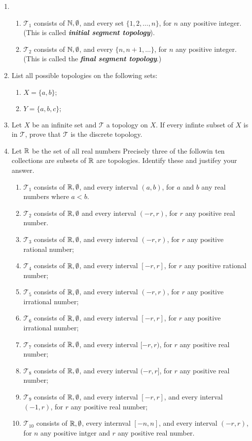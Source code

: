 \documentclass[10pt,a4paper]{report}
\newcommand{\TT}{\mathcal{T}}
\begin{document}
\begin{enumerate}
\item 
\begin{enumerate}[label=(\roman*)]
	\item $\TT_1$ consists of $\mathbb{N}, \emptyset$, and every set $\{1,2,\dots,n\}$, for $n$ any positive integer. (This is called \textbf{\textit{initial segment topology}}).
	\item $\TT_2$ consists of $\mathbb{N},\emptyset$, and every $\{n, n+1, \dots\}$, for $n$ any positive integer. (This is called the \textbf{\textit{final segment topology}}.)
\end{enumerate}

\item List all possible topologies on the following sets:
\begin{enumerate}
	\item $X = \{a,b\};$
	\item $Y = \{a,b,c\};$
\end{enumerate}

\item Let $X$ be an infinite set and $\TT$ a topology on $X$.  If every infinte subset of $X$ is in $\TT$, prove that $\TT$ is the discrete topology.

\item Let $\mathbb{R}$ be the set of all real numbers Precisely three of the followin ten collections are subsets of $\mathbb{R}$ are topologies.  Identify these and justifey your answer.
\begin{enumerate}[label=(\roman*)]
	\item $\TT_1$ consists of $\mathbb{R}, \emptyset$, and every interval $(a,b)$, for $a$ and $b$ any real numbers where $a<b$.
	\item $\TT_2$ consists of $\mathbb{R}, \emptyset$ and every interval $(-r,r)$, for $r$ any positive real number.
	\item $\TT_3$ consists of $\mathbb{R},\emptyset$, and every interval $(-r,r)$, for $r$ any positive rational number;
	\item $\TT_4$ consists of $\mathbb{R},\emptyset$, and every interval $[-r,r]$, for $r$ any positive rational number;
	\item $\TT_5$ consists of $\mathbb{R},\emptyset$, and every interval $(-r,r)$, for $r$ any positive irrational number;
	\item $\TT_6$ consists of $\mathbb{R},\emptyset$, and every interval $[-r,r]$, for $r$ any positive irrational number;
	\item $\TT_7$ consists of $\mathbb{R},\emptyset$, and every interval $[-r,r)$, for $r$ any positive real number;
	\item $\TT_8$ consists of $\mathbb{R},\emptyset$, and every interval $(-r,r]$, for $r$ any positive real number;
	\item $\TT_9$ consists of $\mathbb{R},\emptyset$, and every interval $[-r,r]$,  and every interval $(-1,r)$, for $r$ any positive real number;
	\item $\TT_{10}$ consists of $\mathbb{R}, \emptyset$, every internval $[-n,n]$, and every interval $(-r,r)$, for $n$ any positive intger and $r$ any positive real number.
\end{enumerate}

\end{enumerate}
\end{document}
